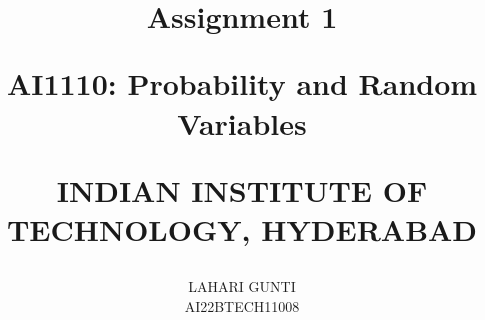 \documentclass[journal,12pt,onecolumn]{IEEEtran}
\begin{document}
 \let\vec\mathbf 
  
  
  
  
 \vspace{3cm} 
  
 \title{ Assignment 1 
  
         \Large AI1110: Probability and Random Variables 
  
          INDIAN INSTITUTE OF TECHNOLOGY, HYDERABAD 
 } 
 \author{ LAHARI GUNTI 
          
         AI22BTECH11008 
 } 
  
 \maketitle 
  
\end{document}
